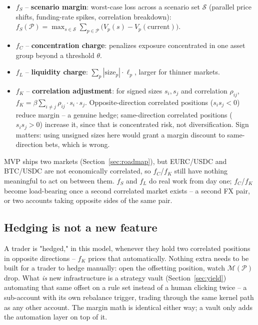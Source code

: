 \documentclass[11pt,a4paper]{article}
\begin{document}
\begin{itemize}
  \item $f_S$ -- \textbf{scenario margin}: worst-case loss across a scenario set $\mathcal{S}$ (parallel price shifts, funding-rate spikes, correlation breakdown): $f_S(\mathcal{P}) = \max_{s \in \mathcal{S}} \sum_{p \in \mathcal{P}} \big(V_p(s) - V_p(\text{current})\big)$.
  \item $f_C$ -- \textbf{concentration charge}: penalizes exposure concentrated in one asset group beyond a threshold $\theta$.
  \item $f_L$ -- \textbf{liquidity charge}: $\sum_p |\text{size}_p| \cdot \ell_p$, larger for thinner markets.
  \item $f_K$ -- \textbf{correlation adjustment}: for signed sizes $s_i, s_j$ and correlation $\rho_{ij}$, $f_K = \beta \sum_{i \neq j} \rho_{ij} \cdot s_i \cdot s_j$. Opposite-direction correlated positions ($s_i s_j < 0$) reduce margin -- a genuine hedge; same-direction correlated positions ($s_i s_j > 0$) increase it, since that is concentrated risk, not diversification. Sign matters: using unsigned sizes here would grant a margin discount to same-direction bets, which is wrong.
\end{itemize}

MVP ships two markets (Section~\ref{sec:roadmap}), but EURC/USDC and BTC/USDC are not economically correlated, so $f_C$/$f_K$ still have nothing meaningful to act on between them. $f_S$ and $f_L$ do real work from day one; $f_C$/$f_K$ become load-bearing once a second correlated market exists -- a second FX pair, or two accounts taking opposite sides of the same pair.

\subsection{Hedging is not a new feature}

A trader is "hedged," in this model, whenever they hold two correlated positions in opposite directions -- $f_K$ prices that automatically. Nothing extra needs to be built for a trader to hedge manually: open the offsetting position, watch $\mathcal{M}(\mathcal{P})$ drop. What \emph{is} new infrastructure is a strategy vault (Section~\ref{sec:yield}) automating that same offset on a rule set instead of a human clicking twice -- a sub-account with its own rebalance trigger, trading through the same kernel path as any other account. The margin math is identical either way; a vault only adds the automation layer on top of it.
\end{document}

